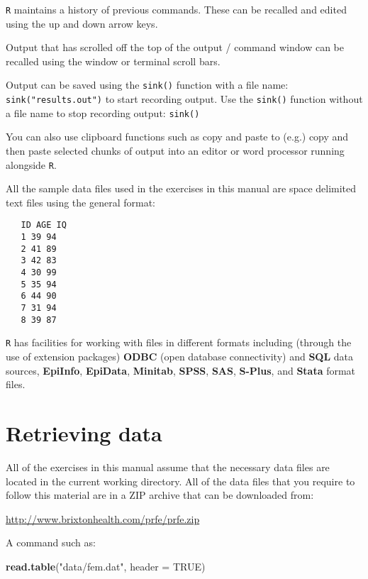 \documentclass[]{book}
\newenvironment{Shaded}{\begin{snugshade}}{\end{snugshade}}
\newcommand{\KeywordTok}[1]{\textcolor[rgb]{0.13,0.29,0.53}{\textbf{#1}}}
\newcommand{\DataTypeTok}[1]{\textcolor[rgb]{0.13,0.29,0.53}{#1}}
\newcommand{\StringTok}[1]{\textcolor[rgb]{0.31,0.60,0.02}{#1}}
\newcommand{\OtherTok}[1]{\textcolor[rgb]{0.56,0.35,0.01}{#1}}
\newcommand{\NormalTok}[1]{#1}
\theoremstyle{definition}
\theoremstyle{definition}
\theoremstyle{definition}
\theoremstyle{remark}
\begin{document}
\texttt{R} maintains a history of previous commands. These can be
recalled and edited using the up and down arrow keys.

Output that has scrolled off the top of the output / command window can
be recalled using the window or terminal scroll bars.

Output can be saved using the \texttt{sink()} function with a file name:
\texttt{sink("results.out")} to start recording output. Use the
\texttt{sink()} function without a file name to stop recording output:
\texttt{sink()}

You can also use clipboard functions such as copy and paste to (e.g.)
copy and then paste selected chunks of output into an editor or word
processor running alongside \texttt{R}.

All the sample data files used in the exercises in this manual are space
delimited text files using the general format:

\begin{verbatim}
   ID AGE IQ
   1 39 94
   2 41 89
   3 42 83
   4 30 99
   5 35 94
   6 44 90
   7 31 94
   8 39 87
\end{verbatim}

\texttt{R} has facilities for working with files in different formats
including (through the use of extension packages) \textbf{ODBC} (open
database connectivity) and \textbf{SQL} data sources, \textbf{EpiInfo},
\textbf{EpiData}, \textbf{Minitab}, \textbf{SPSS}, \textbf{SAS},
\textbf{S-Plus}, and \textbf{Stata} format files.

\hypertarget{retrieving-data}{%
\section{Retrieving data}\label{retrieving-data}}

All of the exercises in this manual assume that the necessary data files
are located in the current working directory. All of the data files that
you require to follow this material are in a ZIP archive that can be
downloaded from:

\url{http://www.brixtonhealth.com/prfe/prfe.zip}

A command such as:

\begin{Shaded}
\begin{Highlighting}[]
\KeywordTok{read.table}\NormalTok{(}\StringTok{"data/fem.dat"}\NormalTok{, }\DataTypeTok{header =} \OtherTok{TRUE}\NormalTok{)}
\end{Highlighting}
\end{Shaded}
\end{document}
